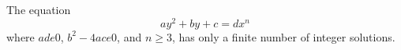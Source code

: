 \begin{proposition}\label{eq:166}
    The equation
\[
    ay^2+by+c=dx^n
\]
    where $ad
    e0$, $b^2-4ac
    e0$, and $n\ge3$, has only a finite number of integer solutions.
\end{proposition}
